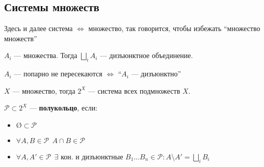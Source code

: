 \subsection*{Системы множеств}

Здесь и далее система \(\iff \) множество, так говорится, чтобы избежать ``множество множеств''

\begin{obozn}
    \(A_i\) --- множества. Тогда \(\bigsqcup\limits_i A_i\) --- дизъюнктное объединение.

    \(A_i\) --- попарно не пересекаются \( \iff \) ``\(A_i\) --- дизъюнктно''
\end{obozn}

\begin{definition}
    \(X\) --- множество, тогда \(2^X\) --- система всех подмножеств \(X\).

    \(\mathcal P \subset 2^X\) --- \textbf{полукольцо}, если:
    \begin{itemize}
        \item \(\text{\O}\subset \mathcal P\)
        \item \(\forall A,B \in \mathcal P \ \ A\cap B\in \mathcal{P}\)
        \item \(\forall A, A' \in \mathcal{P} \ \ \exists \text{ кон. и дизъюнктные } B_1\dots B_n\in \mathcal{P} : A\setminus A' = \bigsqcup\limits_i B_i\)
    \end{itemize}
\end{definition}

